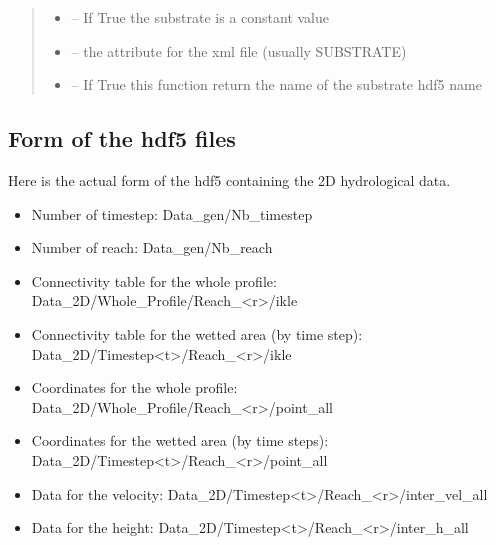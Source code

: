 \documentclass[letterpaper,10pt,english]{sphinxmanual}
\begin{document}
\begin{fulllineitems}
\begin{quote}
\begin{description}
\begin{itemize}
\item {} 
 -- If True the substrate is a constant value

\item {} 
 -- the attribute for the xml file (usually SUBSTRATE)

\item {} 
 -- If True this function return the name of the substrate hdf5 name

\end{itemize}

\end{description}\end{quote}

\end{fulllineitems}



\subsection{Form of the hdf5 files}
\label{\detokenize{index:form-of-the-hdf5-files}}
Here is the actual form of the hdf5 containing the 2D hydrological data.
\begin{itemize}
\item {} 
Number of timestep: Data\_gen/Nb\_timestep

\item {} 
Number of reach: Data\_gen/Nb\_reach

\item {} 
Connectivity table for the whole profile: Data\_2D/Whole\_Profile/Reach\_\textless{}r\textgreater{}/ikle

\item {} 
Connectivity table for the wetted area (by time step): Data\_2D/Timestep\textless{}t\textgreater{}/Reach\_\textless{}r\textgreater{}/ikle

\item {} 
Coordinates for the whole profile: Data\_2D/Whole\_Profile/Reach\_\textless{}r\textgreater{}/point\_all

\item {} 
Coordinates for the wetted area (by time steps): Data\_2D/Timestep\textless{}t\textgreater{}/Reach\_\textless{}r\textgreater{}/point\_all

\item {} 
Data for the velocity: Data\_2D/Timestep\textless{}t\textgreater{}/Reach\_\textless{}r\textgreater{}/inter\_vel\_all

\item {} 
Data for the height:  Data\_2D/Timestep\textless{}t\textgreater{}/Reach\_\textless{}r\textgreater{}/inter\_h\_all

\end{itemize}
\end{document}
